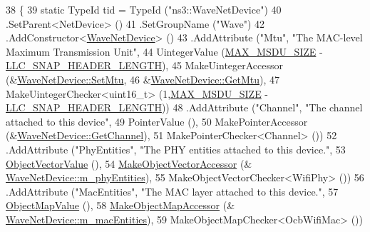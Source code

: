 \begin{DoxyCode}
38 \{
39   \textcolor{keyword}{static} TypeId tid = TypeId (\textcolor{stringliteral}{"ns3::WaveNetDevice"})
40     .SetParent<NetDevice> ()
41     .SetGroupName (\textcolor{stringliteral}{"Wave"})
42     .AddConstructor<\hyperlink{classns3_1_1WaveNetDevice_afd2c31b5c9c07a08ca8252d32ea506d7}{WaveNetDevice}> ()
43     .AddAttribute (\textcolor{stringliteral}{"Mtu"}, \textcolor{stringliteral}{"The MAC-level Maximum Transmission Unit"},
44                    UintegerValue (\hyperlink{classns3_1_1WaveNetDevice_a657b84535129c4bf94fb6720d5052508}{MAX\_MSDU\_SIZE} - 
      \hyperlink{namespacens3_af8522e22bcdefd901bcf12e260491ec8}{LLC\_SNAP\_HEADER\_LENGTH}),
45                    MakeUintegerAccessor (&\hyperlink{classns3_1_1WaveNetDevice_a382714bf5a869123c1a38f5c4a0c7a06}{WaveNetDevice::SetMtu},
46                                          &\hyperlink{classns3_1_1WaveNetDevice_a827dd0721ba254bf2112c8f2642f9a23}{WaveNetDevice::GetMtu}),
47                    MakeUintegerChecker<uint16\_t> (1,\hyperlink{classns3_1_1WaveNetDevice_a657b84535129c4bf94fb6720d5052508}{MAX\_MSDU\_SIZE} - 
      \hyperlink{namespacens3_af8522e22bcdefd901bcf12e260491ec8}{LLC\_SNAP\_HEADER\_LENGTH}))
48     .AddAttribute (\textcolor{stringliteral}{"Channel"}, \textcolor{stringliteral}{"The channel attached to this device"},
49                    PointerValue (),
50                    MakePointerAccessor (&\hyperlink{classns3_1_1WaveNetDevice_a887be3c7138671e2fc3e2caff96ce3dc}{WaveNetDevice::GetChannel}),
51                    MakePointerChecker<Channel> ())
52     .AddAttribute (\textcolor{stringliteral}{"PhyEntities"}, \textcolor{stringliteral}{"The PHY entities attached to this device."},
53                    \hyperlink{namespacens3_a5de726d8bcea7a51fd68ce5167a66713}{ObjectVectorValue} (),
54                    \hyperlink{namespacens3_a6ad5b3621a5dc72b7030cbb07c73adf6}{MakeObjectVectorAccessor} (&
      \hyperlink{classns3_1_1WaveNetDevice_a60401868abeed63f3218b78c076534a8}{WaveNetDevice::m\_phyEntities}),
55                    MakeObjectVectorChecker<WifiPhy> ())
56     .AddAttribute (\textcolor{stringliteral}{"MacEntities"}, \textcolor{stringliteral}{"The MAC layer attached to this device."},
57                    \hyperlink{namespacens3_a5cac680c954929d49b48f4c40c1a2e08}{ObjectMapValue} (),
58                    \hyperlink{namespacens3_acfdf708e388c66beea68eb5ecdcb7456}{MakeObjectMapAccessor} (&
      \hyperlink{classns3_1_1WaveNetDevice_a6db79f07bf41465f7b91dd38ae81f1e8}{WaveNetDevice::m\_macEntities}),
59                    MakeObjectMapChecker<OcbWifiMac> ())

\end{DoxyCode}
